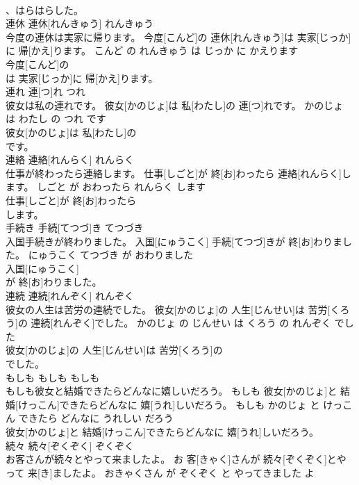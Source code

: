 \documentclass[8pt]{extreport}
\begin{document}
\begin{CJK}{UTF8}{min}
\\	、はらはらした。			
\\	連休	連休[れんきゅう]	れんきゅう	
\\	今度の連休は実家に帰ります。	今度[こんど]の 連休[れんきゅう]は 実家[じっか]に 帰[かえ]ります。	こんど の れんきゅう は じっか に かえります	
\\	今度[こんど]の
\\	は 実家[じっか]に 帰[かえ]ります。			
\\	連れ	連[つ]れ	つれ	
\\	彼女は私の連れです。	彼女[かのじょ]は 私[わたし]の 連[つ]れです。	かのじょ は わたし の つれ です	
\\	彼女[かのじょ]は 私[わたし]の
\\	です。			
\\	連絡	連絡[れんらく]	れんらく	
\\	仕事が終わったら連絡します。	仕事[しごと]が 終[お]わったら 連絡[れんらく]します。	しごと が おわったら れんらく します	
\\	仕事[しごと]が 終[お]わったら
\\	します。			
\\	手続き	手続[てつづ]き	てつづき	
\\	入国手続きが終わりました。	入国[にゅうこく] 手続[てつづ]きが 終[お]わりました。	にゅうこく てつづき が おわりました	
\\	入国[にゅうこく]
\\	が 終[お]わりました。			
\\	連続	連続[れんぞく]	れんぞく	
\\	彼女の人生は苦労の連続でした。	彼女[かのじょ]の 人生[じんせい]は 苦労[くろう]の 連続[れんぞく]でした。	かのじょ の じんせい は くろう の れんぞく でした	
\\	彼女[かのじょ]の 人生[じんせい]は 苦労[くろう]の
\\	でした。			
\\	もしも	もしも	もしも	
\\	もしも彼女と結婚できたらどんなに嬉しいだろう。	もしも 彼女[かのじょ]と 結婚[けっこん]できたらどんなに 嬉[うれ]しいだろう。	もしも かのじょ と けっこん できたら どんなに うれしい だろう	
\\	彼女[かのじょ]と 結婚[けっこん]できたらどんなに 嬉[うれ]しいだろう。			
\\	続々	続々[ぞくぞく]	ぞくぞく	
\\	お客さんが続々とやって来ましたよ。	お 客[きゃく]さんが 続々[ぞくぞく]とやって 来[き]ましたよ。	おきゃくさん が ぞくぞく と やってきました よ	

\end{CJK}
\end{document}
